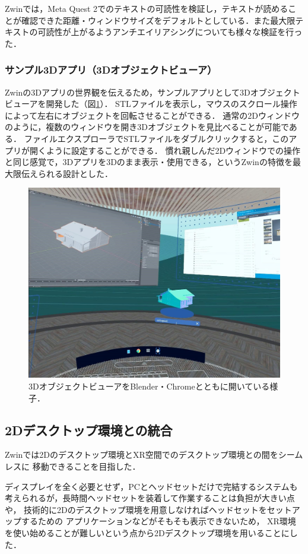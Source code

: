 Zwinでは，Meta Quest 2でのテキストの可読性を検証し，テキストが読めることが確認できた距離・ウィンドウサイズをデフォルトとしている．また最大限テキストの可読性が上がるようアンチエイリアシングについても様々な検証を行った．

\subsubsection{サンプル3Dアプリ（3Dオブジェクトビューア）}
Zwinの3Dアプリの世界観を伝えるため，サンプルアプリとして3Dオブジェクトビューアを開発した（図\ref{fig:viewer}）．
STLファイルを表示し，マウスのスクロール操作によって左右にオブジェクトを回転させることができる．
通常の2Dウィンドウのように，複数のウィンドウを開き3Dオブジェクトを見比べることが可能である．
ファイルエクスプローラでSTLファイルをダブルクリックすると，このアプリが開くように設定することができる．
慣れ親しんだ2Dウィンドウでの操作と同じ感覚で，3Dアプリを3Dのまま表示・使用できる，というZwinの特徴を最大限伝えられる設計とした．

\begin{figure}[htbp]
  \centering
  \includegraphics[keepaspectratio, width=0.7\linewidth]{fig/development/viewer.png}
  \caption{3DオブジェクトビューアをBlender・Chromeとともに開いている様子．}
  \label{fig:viewer}
\end{figure}


\subsection{2Dデスクトップ環境との統合}

Zwinでは2Dのデスクトップ環境とXR空間でのデスクトップ環境との間をシームレスに
移動できることを目指した．

ディスプレイを全く必要とせず，PCとヘッドセットだけで完結するシステムも
考えられるが，長時間ヘッドセットを装着して作業することは負担が大きい点や，
技術的に2Dのデスクトップ環境を用意しなければヘッドセットをセットアップするための
アプリケーションなどがそもそも表示できないため，
XR環境を使い始めることが難しいという点から2Dデスクトップ環境を用いることにした．

